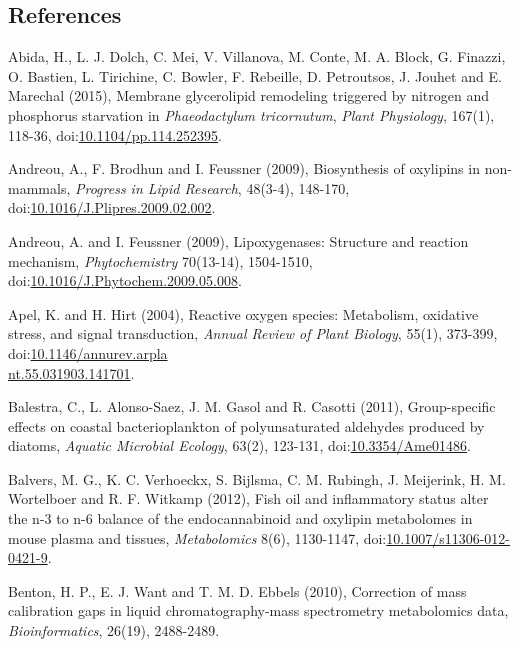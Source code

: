\clearpage
\begin{singlespace}
\section*{References}
\addtocounter{section}{1}
{\setlength{\parindent}{0pt}
Abida, H., L. J. Dolch, C. Mei, V. Villanova, M. Conte, M. A. Block, G. Finazzi, O. Bastien, L. Tirichine, C. Bowler, F. Rebeille, D. Petroutsos, J. Jouhet and E. Marechal (2015), Membrane glycerolipid remodeling triggered by nitrogen and phosphorus starvation in \emph{Phaeodactylum tricornutum}, \emph{Plant Physiology}, 167(1), 118-36, doi:\href{http://dx.doi.org/10.1104/pp.114.252395}{10.1104/pp.114.252395}.

{\setlength{\parskip}{10pt}

Andreou, A., F. Brodhun and I. Feussner (2009), Biosynthesis of oxylipins in non-mammals, \emph{Progress in Lipid Research}, 48(3-4), 148-170, doi:\href{http://dx.doi.org/10.1016/J.Plipres.2009.02.002}{10.1016/J.Plipres.2009.02.002}.

Andreou, A. and I. Feussner (2009), Lipoxygenases: Structure and reaction mechanism, \emph{Phytochemistry} 70(13-14), 1504-1510, doi:\href{http://dx.doi.org/10.1016/J.Phytochem.2009.05.008}{10.1016/J.Phytochem.2009.05.008}.

Apel, K. and H. Hirt (2004), Reactive oxygen species: Metabolism, oxidative stress, and signal transduction, \emph{Annual Review of Plant Biology}, 55(1), 373-399, doi:\href{http://dx.doi.org/10.1146/annurev.arplant.55.031903.141701}{10.1146/annurev.arpla\\nt.55.031903.141701}.

Balestra, C., L. Alonso-Saez, J. M. Gasol and R. Casotti (2011), Group-specific effects on coastal bacterioplankton of polyunsaturated aldehydes produced by diatoms, \emph{Aquatic Microbial Ecology}, 63(2), 123-131, doi:\href{http://dx.doi.org/10.3354/Ame01486}{10.3354/Ame01486}.

Balvers, M. G., K. C. Verhoeckx, S. Bijlsma, C. M. Rubingh, J. Meijerink, H. M. Wortelboer and R. F. Witkamp (2012), Fish oil and inflammatory status alter the n-3 to n-6 balance of the endocannabinoid and oxylipin metabolomes in mouse plasma and tissues, \emph{Metabolomics} 8(6), 1130-1147, doi:\href{http://dx.doi.org/10.1007/s11306-012-0421-9}{10.1007/s11306-012-0421-9}.

Benton, H. P., E. J. Want and T. M. D. Ebbels (2010), Correction of mass calibration gaps in liquid chromatography-mass spectrometry metabolomics data, \emph{Bioinformatics}, 26(19), 2488-2489.

}}
\end{singlespace}
